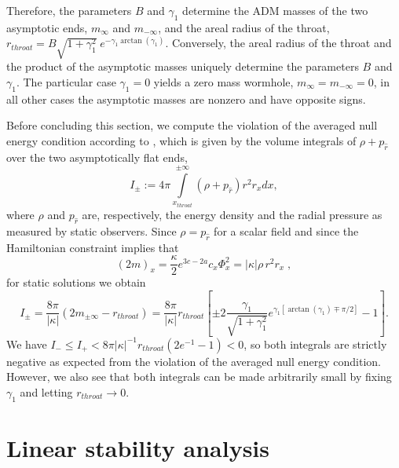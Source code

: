 \documentclass[           %
               showpacs,            %
               preprintnumbers,     %
               aps,                 %
               prd,                 %
               superscriptaddress,      %
               nofootinbib,         %
               tightenlines,        %
               floats,floatfix      %
               ]{revtex4}
\begin{document}
Therefore, the parameters $B$ and $\gamma_1$ determine the ADM masses
of the two asymptotic ends, $m_\infty$ and $m_{-\infty}$, and the
areal radius of the throat, $r_{throat} = B\sqrt{1 + \gamma_1^2}\;
e^{-\gamma_1\arctan(\gamma_1)}$. Conversely, the areal radius of the
throat and the product of the asymptotic masses uniquely determine the
parameters $B$ and $\gamma_1$. The particular case $\gamma_1 = 0$
yields a zero mass wormhole, $m_{\infty} = m_{-\infty} = 0$, in all
other cases the asymptotic masses are nonzero and have opposite signs.

Before concluding this section, we compute the violation of the
averaged null energy condition according to \cite{mVsKnD03}, which is
given by the volume integrals of $\rho + p_{\hat{r}}$ over the two
asymptotically flat ends,
\begin{displaymath}
I_{\pm} := 4\pi \int\limits_{x_{throat}}^{\pm \infty}
 (\rho + p_{\hat{r}}) r^2 r_x dx,
\end{displaymath}
where $\rho$ and $p_{\hat{r}}$ are, respectively, the energy density
and the radial pressure as measured by static observers. Since $\rho
= p_{\hat{r}}$ for a scalar field and since the Hamiltonian constraint
implies that
\begin{displaymath}
(2m)_x = \frac{\kappa}{2} e^{3c-2a} c_x\Phi_x^2 = |\kappa| \rho\, r^2 r_x\; ,
\end{displaymath}
for static solutions we obtain
\begin{equation}
I_\pm = \frac{8\pi}{|\kappa|} (2m_{\pm\infty} - r_{throat}) 
 = \frac{8\pi}{|\kappa|} r_{throat}\left[ 
 \pm 2\frac{\gamma_1}{\sqrt{1 + \gamma_1^2}} 
 e^{\gamma_1[\arctan(\gamma_1) \mp \pi/2]} - 1 \right].
\end{equation}
We have $I_- \leq I_+ < 8\pi|\kappa|^{-1} r_{throat}(2e^{-1} - 1) <
0$, so both integrals are strictly negative as expected from the
violation of the averaged null energy condition. However, we also see
that both integrals can be made arbitrarily small by fixing $\gamma_1$
and letting $r_{throat} \to 0$.



\section{Linear stability analysis}
\label{Sec:LinStabAnal}
\end{document}
